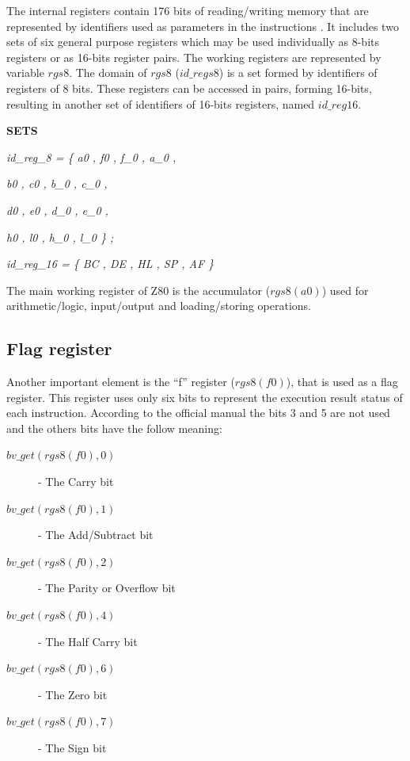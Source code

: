 \documentclass[11pt]{article} %
\begin{document}
% 

 The internal registers contain 176 bits of reading/writing memory that are represented by
identifiers used as parameters in the instructions . It includes two sets of six general purpose
registers which may be used individually as 8-bits registers or as 16-bits register pairs.  The working registers
are represented by variable $\mathit{rgs8}$. The domain of $\mathit{rgs8}$ ($\mathit{id\_regs8}$) is a set
formed by identifiers of registers of 8 bits. These registers can be accessed in pairs, forming 16-bits,
resulting in another set of identifiers of 16-bits registers, named $\mathit{id\_reg16}$.

\begin{sloppypar}
\bf SETS

\hspace*{0.10in}\it id\_reg\_8 \rm = \rm \{ \it a0 \rm , \it f0 \rm , \it f\_0 \rm , \it a\_0 \rm ,

\hspace*{1.0 in}\it b0 \rm , \it c0 \rm , \it b\_0 \rm , \it c\_0 \rm ,

\hspace*{1.00in}\it d0 \rm , \it e0 \rm , \it d\_0 \rm , \it e\_0 \rm ,

\hspace*{1.0in}\it h0 \rm , \it l0 \rm , \it h\_0 \rm , \it l\_0 \} ;

\hspace*{0.10in}\it id\_reg\_16 \rm = \rm \{ \it BC \rm , \it DE \rm , \it HL \rm , \it SP \rm , \it AF \rm \}
\end{sloppypar}

The main working register of Z80 is the accumulator ($\mathit{rgs8(a0)}$) used for arithmetic/logic,
input/output and loading/storing operations.

\subsection{Flag register}
Another important element is the ``f'' register ($\mathit{rgs8(f0)}$),  that is
used as a flag register. This register uses only six bits to represent the execution result status of each instruction.
According to the official manual the bits 3 and 5 are not used and the others bits have the follow meaning:
\begin{description}
  \item[$\mathit{bv\_get(rgs8(f0),0)}$] - The Carry bit
  \item[$\mathit{bv\_get(rgs8(f0),1)}$] - The Add/Subtract bit
  \item[$\mathit{bv\_get(rgs8(f0),2)}$] - The Parity or Overflow bit
  \item[$\mathit{bv\_get(rgs8(f0),4)}$] - The Half Carry bit
  \item[$\mathit{bv\_get(rgs8(f0),6)}$] - The Zero bit
  \item[$\mathit{bv\_get(rgs8(f0),7)}$] - The Sign bit 
\end{description}
\end{document}
